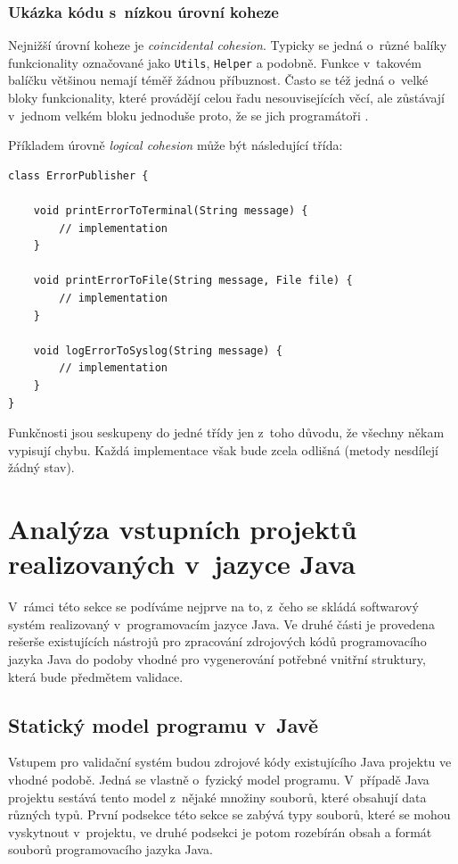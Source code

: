 \subsubsection{Ukázka kódu s~nízkou úrovní koheze}
Nejnižší úrovní koheze je \emph{coincidental cohesion}. Typicky se jedná o~různé balíky funkcionality označované jako \verb+Utils+, \verb+Helper+ a podobně. Funkce v~takovém balíčku většinou nemají téměř žádnou příbuznost. Často se též jedná o~velké bloky funkcionality, které provádějí celou řadu nesouvisejících věcí, ale zůstávají v~jednom velkém bloku jednoduše proto, že se jich programátoři .

Příkladem úrovně \emph{logical cohesion} může být následující třída:

\begin{lstlisting}
class ErrorPublisher {

    void printErrorToTerminal(String message) {
        // implementation
    }

    void printErrorToFile(String message, File file) {
        // implementation
    }

    void logErrorToSyslog(String message) {
        // implementation
    }
}
\end{lstlisting}

Funkčnosti jsou seskupeny do jedné třídy jen z~toho důvodu, že všechny někam vypisují chybu. Každá implementace však bude zcela odlišná (metody nesdílejí žádný stav).

\section{Analýza vstupních projektů realizovaných v~jazyce Java}

V~rámci této sekce se podíváme nejprve na to, z~čeho se skládá softwarový systém realizovaný v~programovacím jazyce Java. Ve druhé části je provedena rešerše existujících nástrojů pro zpracování zdrojových kódů programovacího jazyka Java do podoby vhodné pro vygenerování potřebné vnitřní struktury, která bude předmětem validace.

\subsection{Statický model programu v~Javě}
Vstupem pro validační systém budou zdrojové kódy existujícího Java projektu ve vhodné podobě. Jedná se vlastně o~fyzický model programu. V~případě Java projektu sestává tento model z~nějaké množiny souborů, které obsahují data různých typů. První podsekce této sekce se zabývá typy souborů, které se mohou vyskytnout v~projektu, ve druhé podsekci je potom rozebírán obsah a formát souborů programovacího jazyka Java.

